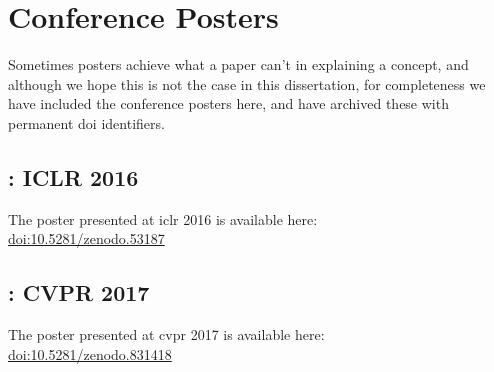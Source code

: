 \documentclass[thesis]{subfiles}
\begin{document}

\chapter{Conference Posters}
\label{posters}
Sometimes posters achieve what a paper can't in explaining a concept, and although we hope this is not the case in this dissertation, for completeness we have included the conference posters here, and have archived these with permanent \gls{doi} identifiers.
\section*{: ICLR 2016}
The poster presented at \gls{iclr} 2016 is available here:\\
\href{https://doi.org/10.5281/zenodo.53187}{doi:10.5281/zenodo.53187}
\afterpage{}
\section*{: CVPR 2017}
The poster presented at \gls{cvpr} 2017 is available here:\\
\href{https://doi.org/10.5281/zenodo.831418}{doi:10.5281/zenodo.831418}
\afterpage{}
\end{document}
